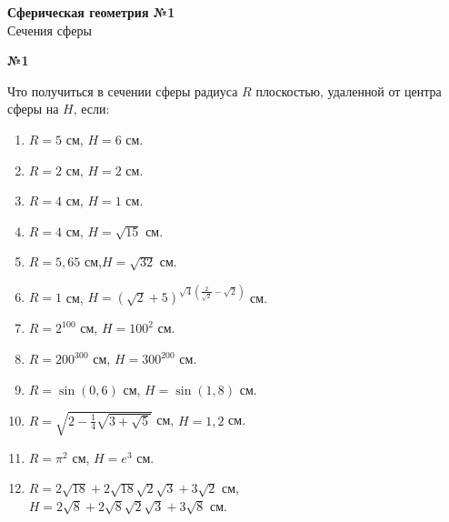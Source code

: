


    \begin{center}
        \textbf{Сферическая геометрия №1}\\
        Сечения сферы
    \end{center}

    \begin{center}
        \textbf{№1}
    \end{center}

    Что получиться в сечении сферы радиуса $R$ плоскостью, удаленной от центра сферы на $H$, если:\\
    \begin{minipage}[t]{0.5\textwidth}
        \begin{enumerate}
            \setcounter{enumi}{0}
            \item $R = 5$ см, $H = 6$ см.
            \item $R = 2$ см, $H = 2$ см.
            \item $R = 4$ см, $H = 1$ см.
            \item $R = 4$ см, $H = \sqrt {15}$ см.
            \item $R = 5,65$ см,$H = \sqrt{32}$ см.
            \item $R = 1$ см, $H = (\sqrt{2} + 5)^{\sqrt{4}\left(\frac{2}{\sqrt{2}} - \sqrt{2}\right)}$ см.
        \end{enumerate}
    \end{minipage}
    \begin{minipage}[t]{0.5\textwidth}
        \begin{enumerate}
            \setcounter{enumi}{6}
            \item $R = 2 ^ {100}$ см, $H = 100 ^ 2$ см.
            \item $R = 200 ^ {300}$ см, $H = 300 ^ {200}$ см.
            \item $R = \sin(0,6)$ см, $H = \sin(1,8)$ см.
            \item $R = \sqrt{2 - \frac{1}{4}\sqrt{3 + \sqrt{5}}}$ см, $H = 1,2$ см.
            \item $R = \pi ^ 2$ см, $H = e ^ 3$ см.
            \item $R = 2\sqrt{18} + 2\sqrt{18}\sqrt{2}\sqrt{3} + 3\sqrt{2}$ см, \\
            $H = 2\sqrt{8} + 2\sqrt{8}\sqrt{2}\sqrt{3} + 3\sqrt{8}$ см.
        \end{enumerate}
    \end{minipage}

